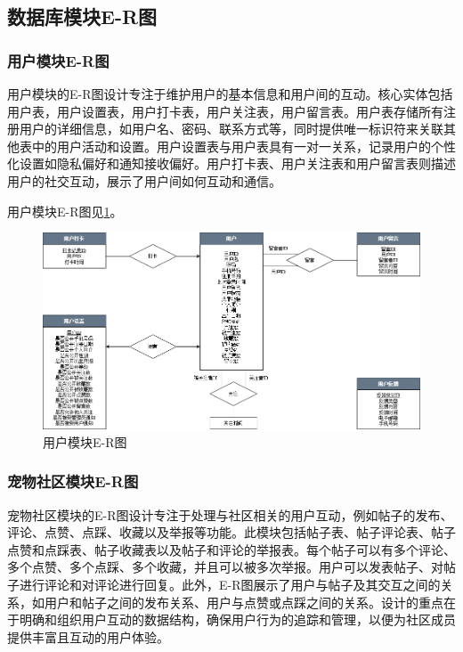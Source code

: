 \subsection{数据库模块E-R图}

\subsubsection{用户模块E-R图}

用户模块的E-R图设计专注于维护用户的基本信息和用户间的互动。核心实体包括用户表，用户设置表，用户打卡表，用户关注表，用户留言表。用户表存储所有注册用户的详细信息，如用户名、密码、联系方式等，同时提供唯一标识符来关联其他表中的用户活动和设置。用户设置表与用户表具有一对一关系，记录用户的个性化设置如隐私偏好和通知接收偏好。用户打卡表、用户关注表和用户留言表则描述用户的社交互动，展示了用户间如何互动和通信。

用户模块E-R图见\cref{fig:UserERDiagram}。

\begin{figure}[htbp]
    \centering
    \includegraphics[width=\textwidth]{figures/UserERDiagram.png}
    \caption{用户模块E-R图}
    \label{fig:UserERDiagram}
\end{figure}

\subsubsection{宠物社区模块E-R图}

宠物社区模块的E-R图设计专注于处理与社区相关的用户互动，例如帖子的发布、评论、点赞、点踩、收藏以及举报等功能。此模块包括帖子表、帖子评论表、帖子点赞和点踩表、帖子收藏表以及帖子和评论的举报表。每个帖子可以有多个评论、多个点赞、多个点踩、多个收藏，并且可以被多次举报。用户可以发表帖子、对帖子进行评论和对评论进行回复。此外，E-R图展示了用户与帖子及其交互之间的关系，如用户和帖子之间的发布关系、用户与点赞或点踩之间的关系。设计的重点在于明确和组织用户互动的数据结构，确保用户行为的追踪和管理，以便为社区成员提供丰富且互动的用户体验。

